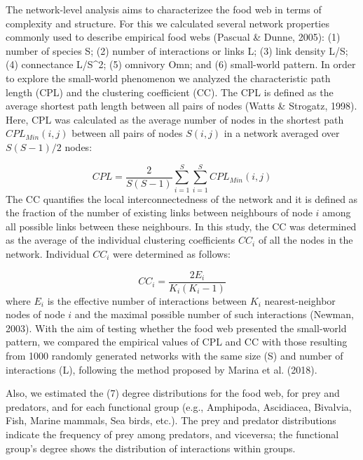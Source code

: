 \documentclass[preprint, 3p,
authoryear]{elsarticle} %
\begin{document}
The network-level analysis aims to characterizee the food web in terms
of complexity and structure. For this we calculated several network
properties commonly used to describe empirical food webs (Pascual \&
Dunne, 2005): (1) number of species S; (2) number of interactions or
links L; (3) link density L/S; (4) connectance L/S\^{}2; (5) omnivory
Omn; and (6) small-world pattern. In order to explore the small-world
phenomenon we analyzed the characteristic path length (CPL) and the
clustering coefficient (CC). The CPL is defined as the average shortest
path length between all pairs of nodes (Watts \& Strogatz, 1998). Here,
CPL was calculated as the average number of nodes in the shortest path
\(CPL_{Min} (i,j)\) between all pairs of nodes \(S(i,j)\) in a network
averaged over \(S(S-1)/2\) nodes:

\[
CPL = \frac{2}{S(S-1)} \sum_{i = 1}^{S} \sum_{i = 1}^{S} {CPL_{Min}(i,j)}
\] The CC quantifies the local interconnectedness of the network and it
is defined as the fraction of the number of existing links between
neighbours of node \(i\) among all possible links between these
neighbours. In this study, the CC was determined as the average of the
individual clustering coefficients \(CC_i\) of all the nodes in the
network. Individual \(CC_i\) were determined as follows:

\[
CC_i = \frac{2E_i}{K_i(K_i-1)}
\] where \(E_i\) is the effective number of interactions between \(K_i\)
nearest-neighbor nodes of node \(i\) and the maximal possible number of
such interactions (Newman, 2003). With the aim of testing whether the
food web presented the small-world pattern, we compared the empirical
values of CPL and CC with those resulting from 1000 randomly generated
networks with the same size (S) and number of interactions (L),
following the method proposed by Marina et al. (2018).

Also, we estimated the (7) degree distributions for the food web, for
prey and predators, and for each functional group (e.g., Amphipoda,
Ascidiacea, Bivalvia, Fish, Marine mammals, Sea birds, etc.). The prey
and predator distributions indicate the frequency of prey among
predators, and viceversa; the functional group's degree shows the
distribution of interactions within groups.
\end{document}
